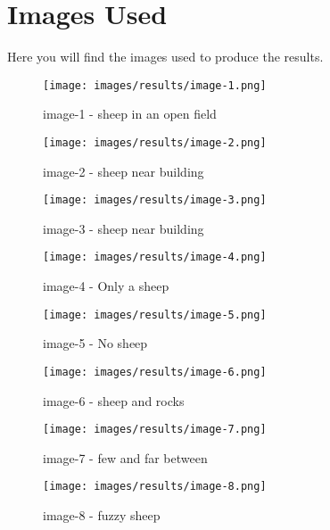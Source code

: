 \chapter{Images Used}
\label{appendix:Images}
 Here you will find the images used to produce the results.
\begin{figure}
    \centering
    \texttt{[image: images/results/image-1.png]}
    \caption{image-1 - sheep in an open field}
    \label{fig:image-1}
\end{figure}
\begin{figure}
    \centering
    \texttt{[image: images/results/image-2.png]}
        \caption{image-2 - sheep near building}
    \label{fig:image-2}
\end{figure}
\begin{figure}
    \centering
    \texttt{[image: images/results/image-3.png]}
            \caption{image-3 - sheep near building}
    \label{fig:image-3}
\end{figure}
\begin{figure}
    \centering
    \texttt{[image: images/results/image-4.png]}
            \caption{image-4 - Only a sheep}
    \label{fig:image-4}
\end{figure}
\begin{figure}
    \centering
    \texttt{[image: images/results/image-5.png]}
            \caption{image-5 - No sheep}
    \label{fig:image-5}
\end{figure}
\begin{figure}
    \centering
    \texttt{[image: images/results/image-6.png]}
            \caption{image-6 - sheep and rocks}
    \label{fig:image-6}
\end{figure}
\begin{figure}
    \centering
    \texttt{[image: images/results/image-7.png]}
            \caption{image-7 - few and far between}
    \label{fig:image-7}
\end{figure}
\begin{figure}
    \centering
    \texttt{[image: images/results/image-8.png]}
            \caption{image-8 - fuzzy sheep}
    \label{fig:image-8}
\end{figure}
